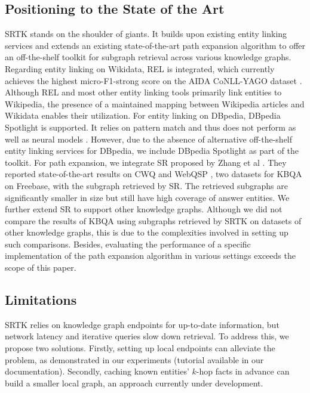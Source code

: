 \documentclass[runningheads]{llncs}
\begin{document}
\subsection{Positioning to the State of the Art}

SRTK stands on the shoulder of giants. It builds upon existing entity linking services and extends an existing state-of-the-art path expansion algorithm to offer an off-the-shelf toolkit for subgraph retrieval across various knowledge graphs. Regarding entity linking on Wikidata, REL \cite{vanHulst2020REL} is integrated, which currently achieves the highest micro-F1-strong score on the AIDA CoNLL-YAGO dataset \cite{hoffart2011aidadataset}. Although REL and most other entity linking tools primarily link entities to Wikipedia, the presence of a maintained mapping between Wikipedia articles and Wikidata enables their utilization. For entity linking on DBpedia, DBpedia Spotlight \cite{mendes2011dbpediaspotlight} is supported. It relies on pattern match and thus does not perform as well as neural models \cite{sevgili2022elsurvey}. However, due to the absence of alternative off-the-shelf entity linking services for DBpedia, we include DBpedia Spotlight as part of the toolkit.  For path expansion, we integrate SR proposed by Zhang et al \cite{zhang2022ruckbqa}. They reported state-of-the-art results on CWQ \cite{talmor2018cwq} and WebQSP \cite{yih2016webqsp}, two datasets for KBQA on Freebase, with the subgraph retrieved by SR. The retrieved subgraphs are significantly smaller in size but still have high coverage of answer entities. We further extend SR to support other knowledge graphs. Although we did not compare the results of KBQA using subgraphs retrieved by SRTK on datasets of other knowledge graphs, this is due to the complexities involved in setting up such comparisons. Besides, evaluating the performance of a specific implementation of the path expansion algorithm in various settings exceeds the scope of this paper.

\subsection{Limitations}

SRTK relies on knowledge graph endpoints for up-to-date information, but network latency and iterative queries slow down retrieval. To address this, we propose two solutions. Firstly, setting up local endpoints can alleviate the problem, as demonstrated in our experiments (tutorial available in our documentation). Secondly, caching known entities' $k$-hop facts in advance can build a smaller local graph, an approach currently under development.
\end{document}
